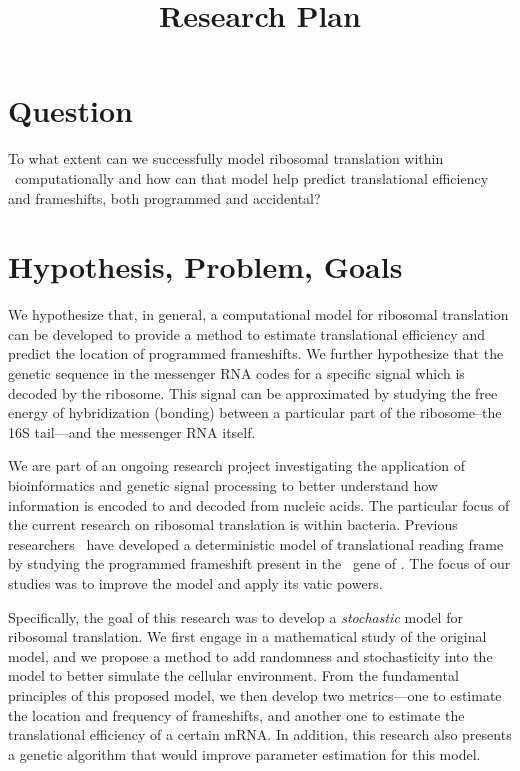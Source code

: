 \documentclass[article, oneside]{memoir}
\author{\BWFauthors}
\title{Research Plan}
\begin{document}
\maketitle
\section{Question}
To what extent can we successfully model ribosomal translation within
\ecoli\ computationally and how can that model help predict
translational efficiency and frameshifts, both programmed and
accidental?

\section{Hypothesis, Problem, Goals}
We hypothesize that, in general, a computational model for ribosomal
translation can be developed to provide a method to estimate translational
efficiency and predict the location of programmed frameshifts.  We further
hypothesize that the genetic sequence in the messenger RNA codes for a 
specific signal which is decoded by the ribosome.  This signal can be 
approximated by studying the free energy of hybridization (bonding) between
a particular part of the ribosome--the 16S tail---and the messenger RNA itself.

We are part of an ongoing research project
investigating the application of bioinformatics
and genetic signal processing to better understand how
information is encoded to and decoded from nucleic acids.  The particular
focus of the current research on ribosomal translation is within
bacteria.  Previous researchers~\cite{lalit:mechanics}
have developed a deterministic model
of translational reading frame by studying the
programmed frameshift present in the \prfB\ gene of \ecoli.  The focus
of our studies was to improve the model and apply its vatic powers.

Specifically, the goal of this research was to develop a 
\emph{stochastic} model for ribosomal translation.  We first engage in
a mathematical study of the original model, and we propose a method
to add randomness and stochasticity into the model to better simulate
the cellular environment.  From the fundamental principles of this
proposed model, we then develop two metrics---one to estimate the
location and frequency of frameshifts, and another one to estimate the
translational efficiency of a certain mRNA.  In addition, this research
also presents a genetic algorithm that would improve parameter estimation
for this model.
\end{document}
